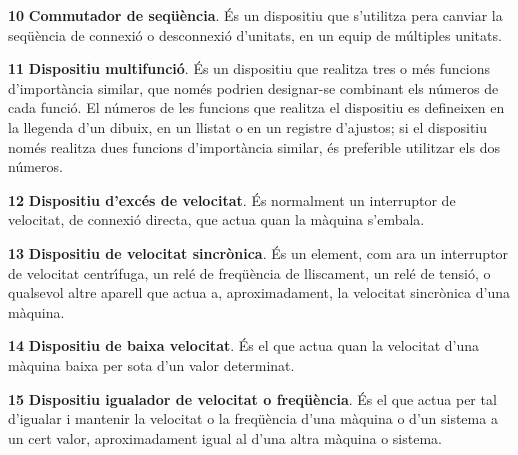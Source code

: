 \begin{multicols}{2}
\begin{list}{}
\item[\textbf{10}]   
\textbf{Commutador de seq\"{u}\`{e}ncia}. \'{E}s un
dispositiu que s'utilitza pera canviar la seq\"{u}\`{e}ncia de connexi\'{o} o
desconnexi\'{o} d'unitats, en un equip de m\'{u}ltiples unitats.


\item[\textbf{11}]  
\textbf{Dispositiu multifunci\'{o}}. \'{E}s un dispositiu que realitza tres o m\'{e}s funcions d'import\`{a}ncia similar, que nom\'{e}s podrien designar-se combinant els n\'{u}meros de cada funci\'{o}. El n\'{u}meros de les funcions que realitza el dispositiu es defineixen en la llegenda d'un dibuix, en un llistat o en un registre d'ajustos; si el dispositiu nom\'{e}s realitza dues funcions d'import\`{a}ncia similar, \'{e}s preferible utilitzar els dos n\'{u}meros.

\item[\textbf{12}]   
\textbf{Dispositiu d'exc\'{e}s de velocitat}. \'{E}s normalment un
interruptor de velocitat, de connexi\'{o} directa, que
actua quan la m\`{a}quina  s'embala.

\item[\textbf{13}]   
\textbf{Dispositiu de velocitat sincr\`{o}nica}. \'{E}s un element, com ara un interruptor de
velocitat centr\'{\i}fuga, un rel\'{e} de freq\"{u}\`{e}ncia de lliscament, un rel\'{e}
de tensi\'{o}, o qualsevol altre aparell que actua a, aproximadament, la
velocitat sincr\`{o}nica d'una m\`{a}quina.


\item[\textbf{14}]   
\textbf{Dispositiu de baixa velocitat}. \'{E}s el que actua quan la velocitat d'una m\`{a}quina baixa per sota d'un valor determinat.

\item[\textbf{15}]  
\textbf{Dispositiu igualador de velocitat o freq\"{u}\`{e}ncia}. \'{E}s el que
actua per tal d'igualar i mantenir la velocitat o la  freq\"{u}\`{e}ncia
d'una m\`{a}quina o d'un sistema a un cert valor, aproximadament igual
al  d'una altra m\`{a}quina o sistema.


\end{list}
\end{multicols}

